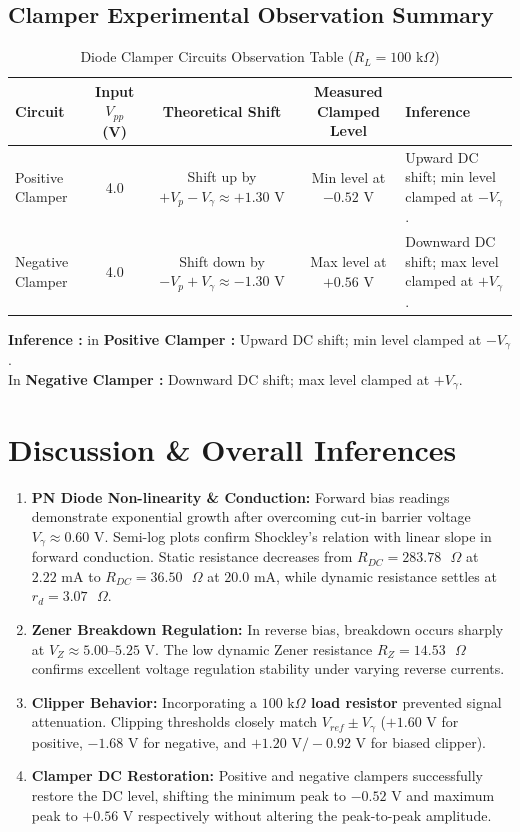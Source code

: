 \documentclass[11pt,a4paper]{article}
\begin{document}
\subsection{Clamper Experimental Observation Summary}
\begin{table}[H]
\centering
\caption{Diode Clamper Circuits Observation Table ($R_L = 100\text{ k}\Omega$)}
\begin{tabular}{l c c c l}
\toprule
\textbf{Circuit} & \textbf{Input $V_{pp}$ (V)} & \textbf{Theoretical Shift} & \textbf{Measured Clamped Level} & \textbf{Inference} \\
\midrule
Positive Clamper & 4.0 & Shift up by $+V_p - V_\gamma \approx +1.30\text{ V}$ & Min level at $-0.52\text{ V}$ & Upward DC shift; min level clamped at $-V_\gamma$. \\
Negative Clamper & 4.0 & Shift down by $-V_p + V_\gamma \approx -1.30\text{ V}$ & Max level at $+0.56\text{ V}$ & Downward DC shift; max level clamped at $+V_\gamma$. \\
\bottomrule
\end{tabular}
\end{table}

\textbf{Inference :} in \textbf{Positive Clamper : } Upward DC shift; min level clamped at $-V_\gamma$. \\

In \textbf{Negative Clamper : } Downward DC shift; max level clamped at $+V_\gamma$.  

\section{Discussion \& Overall Inferences}
\begin{enumerate}
    \item \textbf{PN Diode Non-linearity \& Conduction:} Forward bias readings demonstrate exponential growth after overcoming cut-in barrier voltage \textbf{$V_\gamma \approx 0.60\text{ V}$}. Semi-log plots confirm Shockley's relation with linear slope in forward conduction. Static resistance decreases from \textbf{$R_{DC} = 283.78\text{ }\Omega$} at $2.22\text{ mA}$ to \textbf{$R_{DC} = 36.50\text{ }\Omega$} at $20.0\text{ mA}$, while dynamic resistance settles at \textbf{$r_d = 3.07\text{ }\Omega$}.
    \item \textbf{Zener Breakdown Regulation:} In reverse bias, breakdown occurs sharply at \textbf{$V_Z \approx 5.00\text{--}5.25\text{ V}$}. The low dynamic Zener resistance \textbf{$R_Z = 14.53\text{ }\Omega$} confirms excellent voltage regulation stability under varying reverse currents.
    \item \textbf{Clipper Behavior:} Incorporating a \textbf{$100\text{ k}\Omega$ load resistor} prevented signal attenuation. Clipping thresholds closely match $V_{ref} \pm V_\gamma$ (\textbf{$+1.60\text{ V}$} for positive, \textbf{$-1.68\text{ V}$} for negative, and \textbf{$+1.20\text{ V} / -0.92\text{ V}$} for biased clipper).
    \item \textbf{Clamper DC Restoration:} Positive and negative clampers successfully restore the DC level, shifting the minimum peak to \textbf{$-0.52\text{ V}$} and maximum peak to \textbf{$+0.56\text{ V}$} respectively without altering the peak-to-peak amplitude.
\end{enumerate}
\end{document}
